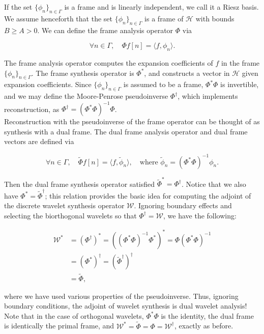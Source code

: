 \documentclass[journal]{IEEEtran}
\begin{document}
\noindent If the set $\{\phi_n\}_{n\in\Gamma}$ is a frame and is linearly independent, we call it a Riesz basis.\\

We assume henceforth that the set $\{\phi_n\}_{n\in\Gamma}$ is a frame of $\mathcal{H}$ with bounds $B\ge A > 0$.  We can define the frame analysis operator $\Phi$ via

\[ \forall n\in \Gamma,\quad \Phi f[n] = \langle f,\phi_n\rangle. \] 

\noindent The frame analysis operator computes the expansion coefficients of $f$ in the frame $\{\phi_n\}_{n\in\Gamma}$.  The frame synthesis operator is $\Phi^\ast$, and constructs a vector in $\mathcal{H}$ given expansion coefficients.  Since $\{\phi_n\}_{n\in\Gamma}$ is assumed to be a frame, $\Phi^\ast\Phi$ is invertible, and we may define the Moore-Penrose pseudoinverse $\Phi^\dagger$, which implements reconstruction, as $\Phi^\dagger = \left(\Phi^\ast\Phi\right)^{-1}\Phi$.\\

Reconstruction with the pseudoinverse of the frame operator can be thought of as synthesis with a dual frame.  The dual frame analysis operator and dual frame vectors are defined via

\[ \forall n\in \Gamma, \quad \tilde{\Phi}f[n] = \langle f,\tilde{\phi}_n\rangle, \quad \text{where } \tilde{\phi}_n = \left(\Phi^\ast\Phi\right)^{-1}\phi_n. \] 

\noindent Then the dual frame synthesis operator satisfied $\tilde{\Phi}^\ast = \Phi^\dagger$.  Notice that we also have $\Phi^\ast = \tilde{\Phi}^\dagger$; this relation provides the basic idea for computing the adjoint of the discrete wavelet synthesis operator $\mathcal{W}$.  Ignoring boundary effects and selecting the biorthogonal wavelets so that $\Phi^\dagger=\mathcal{W}$, we have the following:

\begin{align*}
   \mathcal{W}^\ast &= \left(\Phi^\dagger\right)^\ast = \left(\left(\Phi^\ast\Phi\right)^{-1}\Phi^\ast\right)^\ast = \Phi\left(\Phi^\ast\Phi\right)^{-1}\\ 
                    &= \left(\Phi^\ast\right)^\dagger = \left(\tilde{\Phi}^\dagger\right)^\dagger\\
                    &= \tilde{\Phi},
\end{align*}

\noindent where we have used various properties of the pseudoinverse.  Thus, ignoring boundary conditions, the adjoint of wavelet synthesis is dual wavelet analysis!  Note that in the case of orthogonal wavelets, $\Phi^\ast\Phi$ is the identity, the dual frame is identically the primal frame, and ${\mathcal{W}^\ast = \tilde{\Phi}=\Phi=\mathcal{W}^\dagger}$, exactly as before.\\
\end{document}
